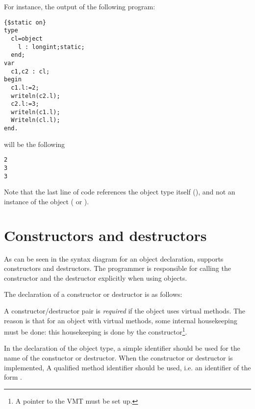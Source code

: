 For instance, the output of the following program:
\begin{verbatim}
{$static on}
type
  cl=object
    l : longint;static;
  end;
var
  c1,c2 : cl;
begin
  c1.l:=2;
  writeln(c2.l);
  c2.l:=3;
  writeln(c1.l);
  Writeln(cl.l);
end.
\end{verbatim}
will be the following
\begin{verbatim}
2
3
3
\end{verbatim}
Note that the last line of code references the object type itself (), 
and not an instance of the object ( or ).


\section{Constructors and destructors }
\label{se:constructdestruct}
As can be seen in the syntax diagram for an object declaration, \fpc supports
constructors and destructors. The programmer is responsible for calling the
constructor and the destructor explicitly when using objects.

The declaration of a constructor or destructor is as follows:

A constructor/destructor pair is {\em required} if the object uses virtual methods.
The reason is that for an object with virtual methods, some internal
housekeeping must be done: this housekeeping is done by the
constructor\footnote{A pointer to the VMT must be set up.}.

In the declaration of the object type, a simple identifier should be used
for the name of the constuctor or destructor. When the constructor or destructor
is implemented, A qualified method identifier should be used,
i.e. an identifier of the form .

